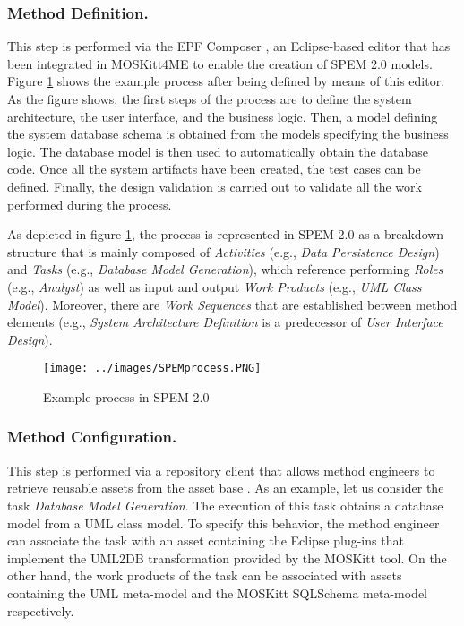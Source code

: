 \documentclass[runningheads,a4paper]{llncs}
\begin{document}
\subsubsection{Method Definition.}

This step is performed via the EPF Composer \cite{epf}, an
Eclipse-based editor that has been integrated in MOSKitt4ME to enable the
creation of SPEM 2.0 models. Figure \ref{SPEMprocess} shows the
example process after being defined by means of this editor. As the figure
shows, the first steps of the process are to define the system architecture, the
user interface, and the business logic. Then, a model defining the system
database schema is obtained from the models specifying the business logic. The
database model is then used to automatically obtain the database code. Once all
the system artifacts have been created, the test cases can be defined. Finally,
the design validation is carried out to validate all the work performed during
the process.

As depicted in figure \ref{SPEMprocess}, the process is represented in SPEM 2.0
as a breakdown structure that is mainly composed of \textit{Activities} (e.g.,
\textit{Data Persistence Design}) and \textit{Tasks} (e.g.,
\textit{Database Model Generation}), which reference performing \textit{Roles}
(e.g., \textit{Analyst}) as well as input and output \textit{Work Products}
(e.g., \textit{UML Class Model}). Moreover, there are \textit{Work Sequences}
that are established between method elements (e.g., \textit{System Architecture
Definition} is a predecessor of \textit{User Interface Design}).

\begin{figure}
\centering
\texttt{[image: ../images/SPEMprocess.PNG]}
\caption{Example process in SPEM 2.0}
\label{SPEMprocess}
\end{figure}

\subsubsection{Method Configuration.}

This step is performed via a repository client that allows method
engineers to retrieve reusable assets from the asset base \cite{Cervera11}. As
an example, let us consider the task \textit{Database Model Generation}. The
execution of this task obtains a database model from a UML class model. To
specify this behavior, the method engineer can associate the task with an asset
containing the Eclipse plug-ins that implement the UML2DB transformation
provided by the MOSKitt tool. On the other hand, the work products of the task
can be associated with assets containing the UML meta-model and the MOSKitt
SQLSchema meta-model respectively.
\end{document}

